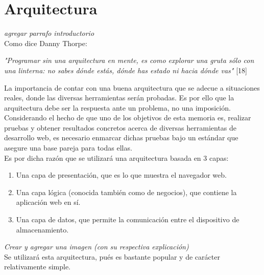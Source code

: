 \section{Arquitectura}

\textit{agregar parrafo introductorio}\\
Como dice Danny Thorpe:
\begin{center}
 \textit{"Programar sin una arquitectura en mente, es como explorar una gruta sólo con una
 linterna: no sabes dónde estás, dónde has estado ni hacia dónde vas"} [18]
\end{center}
La importancia de contar con una buena arquitectura que se adecue a situaciones reales, donde 
las diversas herramientas serán probadas. Es por ello que la arquitectura debe ser la respuesta 
ante un problema, no una imposición.\\

Considerando el hecho de que uno de los objetivos de esta memoria es, realizar pruebas y obtener
resultados concretos acerca de diversas herramientas de desarrollo web, es necesario enmarcar
dichas pruebas bajo un estándar que asegure una base pareja para todas ellas.\\

Es por dicha razón que se utilizará una arquitectura basada en 3 capas:
\begin{enumerate}
 \item Una capa de presentación, que es lo que muestra el navegador web.
 \item Una capa lógica (conocida también como de negocios), que contiene la aplicación web en sí.
 \item Una capa de datos, que permite la comunicación entre el dispositivo de almacenamiento.
\end{enumerate}

\textit{Crear y agregar una imagen (con su respectiva explicación)}\\

Se utilizará esta arquitectura, pués es bastante popular y de carácter relativamente simple.





\newpage
